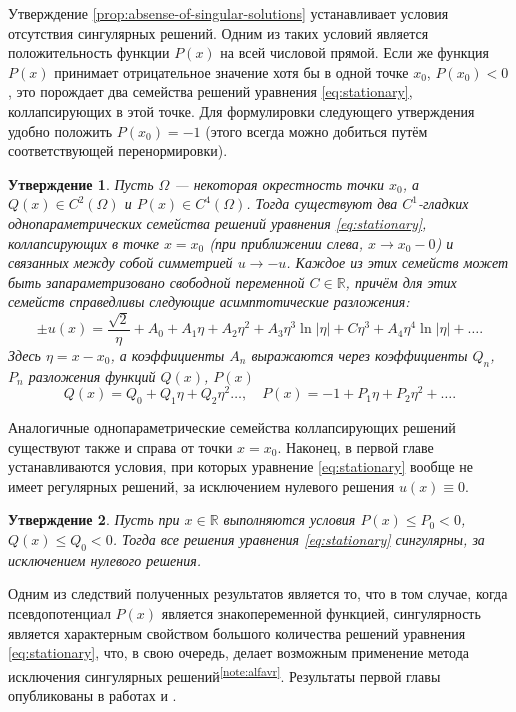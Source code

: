 \documentclass[candidate, href, colorlinks]{disser}
\newtheorem{proposition}{Утверждение}
\begin{document}
Утверждение \ref{prop:absense-of-singular-solutions} устанавливает условия отсутствия сингулярных решений.
Одним из таких условий является положительность функции $P(x)$ на всей числовой прямой.
Если же функция $P(x)$ принимает отрицательное значение хотя бы в одной точке $x_0$, $P(x_0) < 0$, это порождает два семейства решений уравнения \eqref{eq:stationary}, коллапсирующих в этой точке.
Для формулировки следующего утверждения удобно положить $P(x_0) = -1$ (этого всегда можно добиться путём соответствующей перенормировки).

\begin{proposition}
\label{prop:singular-families}
	Пусть $\Omega$ --- некоторая окрестность точки $x_0$, а $Q(x) \in C^2(\Omega)$ и $P(x) \in C^4(\Omega)$.
	Тогда существуют два $C^1$-гладких однопараметрических семейства решений уравнения \eqref{eq:stationary}, коллапсирующих в точке $x = x_0$ (при приближении слева, $x \to x_0{-}0$) и связанных между собой симметрией $u \to -u$.
	Каждое из этих семейств может быть запараметризовано свободной переменной $C \in \mathbb{R}$, причём для этих семейств справедливы следующие асимптотические разложения:
	\begin{equation}
		\pm u(x) = \dfrac{\sqrt{2}}{\eta} + A_0 + A_1 \eta + A_2 \eta^2 + A_3 \eta^3 \ln |\eta| + C \eta^3+ A_4 \eta^4 \ln |\eta| + \dots.
	\label{eq:expansion}
	\end{equation}
	Здесь $\eta = x - x_0$, а коэффициенты $A_n$ выражаются через коэффициенты $Q_n$, $P_n$ разложения функций $Q(x)$, $P(x)$
	\begin{equation}
		Q(x) = Q_0 + Q_1 \eta + Q_2 \eta^2 \dots, \quad P(x) = -1 + P_1 \eta + P_2 \eta^2 + \dots.
	\end{equation}
\end{proposition}

Аналогичные однопараметрические семейства коллапсирующих решений существуют также и справа от точки $x = x_0$.
Наконец, в первой главе устанавливаются условия, при которых уравнение \eqref{eq:stationary} вообще не имеет регулярных решений, за исключением нулевого решения $u(x) \equiv 0$.

\begin{proposition}
\label{prop:all-solutions-are-singular}
 	Пусть при $x \in \mathbb{R}$ выполняются условия $P(x) \le P_0 < 0$, $Q(x) \le Q_0 < 0$.
 	Тогда все решения уравнения \eqref{eq:stationary} сингулярны, за исключением нулевого решения.
\end{proposition}

Одним из следствий полученных результатов является то, что в том случае, когда псевдопотенциал $P(x)$ является знакопеременной функцией, сингулярность является характерным свойством большого количества решений уравнения \eqref{eq:stationary}, что, в свою очередь, делает возможным применение метода исключения сингулярных решений\textsuperscript{\ref{note:alfavr}}.
Результаты первой главы опубликованы в работах \cite{AlfimovLebedev} и \cite{Ufa2015}.
\end{document}
